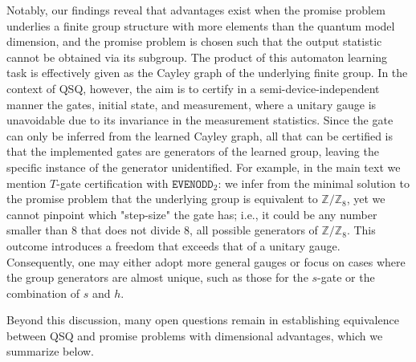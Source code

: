 \documentclass[../main.tex]{subfiles}
\begin{document}
Notably, our findings reveal that advantages exist when the promise problem underlies a finite group structure with more elements than the quantum model dimension, and the promise problem is chosen such that the output statistic cannot be obtained via its subgroup. The product of this automaton learning task is effectively given as the Cayley graph of the underlying finite group. In the context of QSQ, however, the aim is to certify in a semi-device-independent manner the gates, initial state, and measurement, where a unitary gauge is unavoidable due to its invariance in the measurement statistics. Since the gate can only be inferred from the learned Cayley graph, all that can be certified is that the implemented gates are generators of the learned group, leaving the specific instance of the generator unidentified. For example, in the main text we mention $T$-gate certification with $\mathtt{EVENODD}_2$: we infer from the minimal solution to the promise problem that the underlying group is equivalent to  $\mathbb{Z}/\mathbb{Z}_8$, yet we cannot pinpoint which "step-size" the gate has; i.e., it could be any number smaller than 8 that does not divide 8, all possible generators of $\mathbb{Z}/\mathbb{Z}_8$. This outcome introduces a freedom that exceeds that of a unitary gauge. Consequently, one may either adopt more general gauges or focus on cases where the group generators are almost unique, such as those for the $s$-gate or the combination of $s$ and $h$.

Beyond this discussion, many open questions remain in establishing equivalence between QSQ and promise problems with dimensional advantages, which we summarize below.
\end{document}
